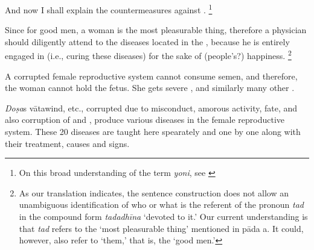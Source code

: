 \begin{translation}

\item [1] And now I shall explain the countermeasures against .%
	\footnote{%
	On this broad understanding of the term \emph{yoni}, see \cite[pp.\ 
	572--5]{das-orig}}

\item [2] Since for good men, a woman is the most pleasurable thing, therefore a physician should diligently attend to the diseases located in the , because he is entirely engaged in (i.e., curing these diseases) for the sake of (people's?) happiness.%
	\footnote{%
	As our translation indicates, the sentence construction does not allow an 
	unambiguous identification of who or what is the referent of the pronoun 
	\textit{tad} in the compound form \emph{tadadhīna} ‘devoted to it.’ Our 
	current understanding is that \emph{tad} refers to the ‘most pleasurable thing’ 
	mentioned in pāda a. It could, however, also refer to ‘them,’ that is, the ‘good 
	men.’%
	}

\item [3] A corrupted female reproductive system cannot consume semen, and therefore, the woman cannot hold the fetus. She gets severe ,  and similarly many other .

\item [4] \emph{Doṣa}s \si{vāta}{wind}, etc., corrupted due to misconduct, amorous activity, fate, and also corruption of  and , produce various diseases in the female reproductive system. These 20 diseases are taught here spearately and one by one along with their treatment, causes and signs.


\end{translation}
